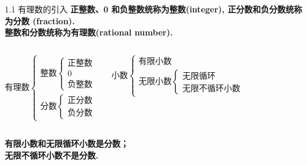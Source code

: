 \begin{frame}{1.1 有理数的引入}
\textbf{正整数、0 和负整数统称为整数(integer), 正分数和负分数统称为分数
(fraction).\\
整数和分数统称为有理数(rational number).}
\vspace{24pt}
\begin{columns}
\[
\mbox{有理数}\begin{cases}
\mbox{整数} \begin{cases}
    \mbox{正整数} \\
    0 \\
    \mbox{负整数}
    \end{cases} \\
\mbox{分数}  \begin{cases}
    \mbox{正分数} \\
    \mbox{负分数}
    \end{cases}
\end{cases}
\]

\[
\mbox{小数}\begin{cases}
\mbox{有限小数} \\
\mbox{无限小数} \begin{cases} 
\mbox{无限循环} \\
\mbox{无限不循环小数}
\end{cases}
\end{cases}
\]

\end{columns}
\vspace{24pt}
\textbf{有限小数和无限循环小数是分数；\\
无限不循环小数不是分数.}
\end{frame}
